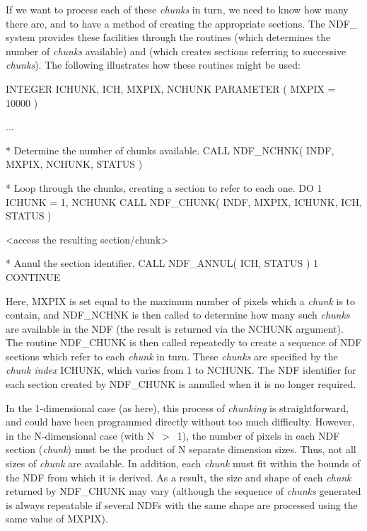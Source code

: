 \documentclass[twoside,11pt,nolof]{starlink}
\providecommand{\st}[1]{{\emph{#1}}}
\begin{document}
If we want to process each of these \st{chunks\/} in turn, we need to
know how many there are, and to have a method of creating the
appropriate sections. The NDF\_ system provides these facilities through
the routines  (which determines the number of \st{chunks\/}
available) and  (which creates sections referring to
successive \st{chunks\/}). The following illustrates how these routines
might be used:

\small
\begin{terminalv}
      INTEGER ICHUNK, ICH, MXPIX, NCHUNK
      PARAMETER ( MXPIX = 10000 )

      ...

*  Determine the number of chunks available.
      CALL NDF_NCHNK( INDF, MXPIX, NCHUNK, STATUS )

*  Loop through the chunks, creating a section to refer to each one.
      DO 1 ICHUNK = 1, NCHUNK
         CALL NDF_CHUNK( INDF, MXPIX, ICHUNK, ICH, STATUS )

         <access the resulting section/chunk>

*  Annul the section identifier.
         CALL NDF_ANNUL( ICH, STATUS )
 1    CONTINUE
\end{terminalv}
\normalsize

Here, MXPIX is set equal to the maximum number of pixels which a
\st{chunk\/} is to contain, and NDF\_NCHNK is then called to determine
how
many such \st{chunks\/} are available in the NDF (the result is
returned via the NCHUNK argument). The routine NDF\_CHUNK is then
called repeatedly to create a sequence of NDF sections which refer to
each \st{chunk\/} in turn. These \st{chunks\/} are specified by the
\st{chunk index\/} ICHUNK, which varies from 1 to NCHUNK. The NDF
identifier for each section created by NDF\_CHUNK is annulled when it is
no longer required.

In the 1-dimensional case (as here), this process of \st{chunking\/} is
straightforward, and could have been programmed directly without too
much difficulty. However, in the N-dimensional case (with N~$>$~1), the
number of pixels in each NDF section (\st{chunk\/}) must be the product
of N separate dimension sizes. Thus, not all sizes of \st{chunk\/} are
available. In addition, each \st{chunk\/} must fit within the bounds of
the NDF from which it is derived. As a result, the size and shape of
each \st{chunk\/} returned by NDF\_CHUNK may vary (although the sequence of
\st{chunks\/} generated is always repeatable if several NDFs with the same
shape are processed using the same value of MXPIX).
\end{document}

